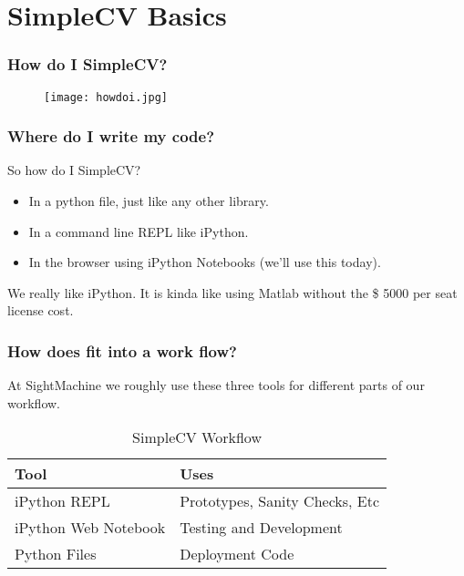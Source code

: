 \documentclass[compress]{beamer}
\begin{document}
\section{SimpleCV Basics}

\begin{frame}
\frametitle{How do I SimpleCV?}

\begin{figure}
  \texttt{[image: howdoi.jpg]}
\end{figure}

\end{frame}

 
\begin{frame}
\frametitle{Where do I write my code?}

\large{So how do I SimpleCV?}
\begin{itemize}
\item In a python file, just like any other library.
\item In a command line REPL like iPython.
\item In the browser using iPython Notebooks (we'll use this today).
\end{itemize}
We really like iPython. It is kinda like using Matlab without the \$ 5000
per seat license cost. 
\end{frame}


\begin{frame}
\frametitle{How does fit into a work flow?}
At SightMachine we roughly use these three tools 
for different parts of our workflow.
\begin{table}
\begin{tabular}{l l }
\toprule
\textbf{Tool} & \textbf{Uses} \\
\midrule
iPython REPL & Prototypes, Sanity Checks, Etc \\
iPython Web Notebook & Testing and Development \\
Python Files  & Deployment Code \\
\bottomrule
\end{tabular}
\caption{SimpleCV Workflow}
\end{table}
\end{frame}


\end{document}
